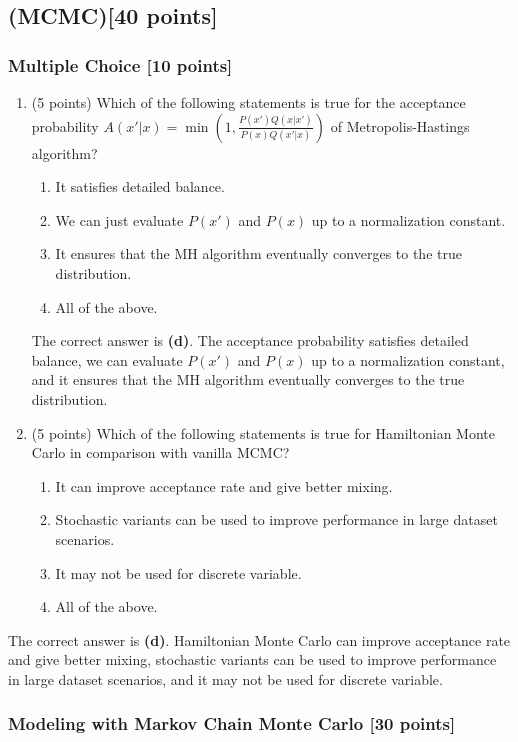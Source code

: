 \documentclass{article}
\begin{document}
\subsection{(MCMC)[40 points]}
\subsubsection{Multiple Choice [10 points]}
\begin{enumerate}
\item (5 points) Which of the following statements is true for the acceptance probability
$A(x'|x) = \min(1, \frac{P(x')Q(x|x')}{P(x)Q(x'|x)})$ of Metropolis-Hastings algorithm?
\begin{enumerate}
\item It satisfies detailed balance.
\item We can just evaluate $P(x')$ and $P(x)$ up to a normalization constant.
\item It ensures that the MH algorithm eventually converges to the true distribution.
\item All of the above.
\end{enumerate}

The correct answer is \textbf{(d)}. The acceptance probability satisfies detailed balance, we can evaluate $P(x')$ and $P(x)$ up to a normalization constant, and it ensures that the MH algorithm eventually converges to the true distribution.

\item (5 points) Which of the following statements is true for Hamiltonian Monte Carlo in comparison with
vanilla MCMC?
\begin{enumerate}
\item It can improve acceptance rate and give better mixing.
\item Stochastic variants can be used to improve performance in large dataset scenarios.
\item It may not be used for discrete variable.
\item All of the above.
\end{enumerate}
\end{enumerate}

The correct answer is \textbf{(d)}. Hamiltonian Monte Carlo can improve acceptance rate and give better mixing, stochastic variants can be used to improve performance in large dataset scenarios, and it may not be used for discrete variable.

\subsubsection{Modeling with Markov Chain Monte Carlo [30 points]}
\end{document}
